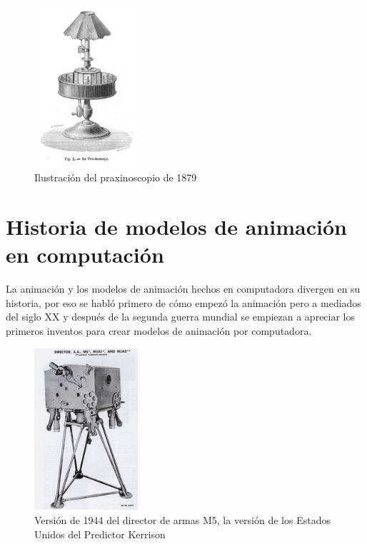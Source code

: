 \documentclass[a4paper,12pt]{report}
\begin{document}
 
\begin{figure}[ht]
\centering
\includegraphics[height=6cm]{Imagenes/praxinoscope}
\caption{Ilustración del praxinoscopio de 1879}
\label{fig:praxinoscopio_ilus}
\end{figure}
 
 
\chapter{Historia de modelos de animación en computación}
 
La animación y los modelos de animación hechos en computadora divergen en su historia,
por eso se habló primero de cómo empezó la animación pero a mediados del siglo XX y después
de la segunda guerra mundial se empiezan a apreciar los primeros inventos para crear modelos de animación
por computadora.
 
 
\begin{figure}[ht]
\centering
\includegraphics[height=6cm]{Imagenes/m5_director}
\caption{Versión de 1944 del director de armas M5, la versión de los Estados Unidos del Predictor Kerrison}
\label{fig:m5_director}
\end{figure}
 
 
\newpage
 
\end{document}
